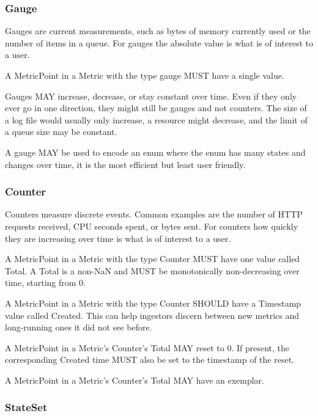 \documentclass[a4paper,12pt,notitlepage,twoside,openright]{article}
\begin{document}
\hypertarget{gauge}{%
\subsubsection{Gauge}\label{gauge}}

Gauges are current measurements, such as bytes of memory currently used
or the number of items in a queue. For gauges the absolute value is what
is of interest to a user.

A MetricPoint in a Metric with the type gauge MUST have a single value.

Gauges MAY increase, decrease, or stay constant over time. Even if they
only ever go in one direction, they might still be gauges and not
counters. The size of a log file would usually only increase, a resource
might decrease, and the limit of a queue size may be constant.

A gauge MAY be used to encode an enum where the enum has many states and
changes over time, it is the most efficient but least user friendly.

\hypertarget{counter}{%
\subsubsection{Counter}\label{counter}}

Counters measure discrete events. Common examples are the number of HTTP
requests received, CPU seconds spent, or bytes sent. For counters how
quickly they are increasing over time is what is of interest to a user.

A MetricPoint in a Metric with the type Counter MUST have one value
called Total. A Total is a non-NaN and MUST be monotonically
non-decreasing over time, starting from 0.

A MetricPoint in a Metric with the type Counter SHOULD have a Timestamp
value called Created. This can help ingestors discern between new
metrics and long-running ones it did not see before.

A MetricPoint in a Metric's Counter's Total MAY reset to 0. If present,
the corresponding Created time MUST also be set to the timestamp of the
reset.

A MetricPoint in a Metric's Counter's Total MAY have an exemplar.

\hypertarget{stateset}{%
\subsubsection{StateSet}\label{stateset}}
\end{document}
